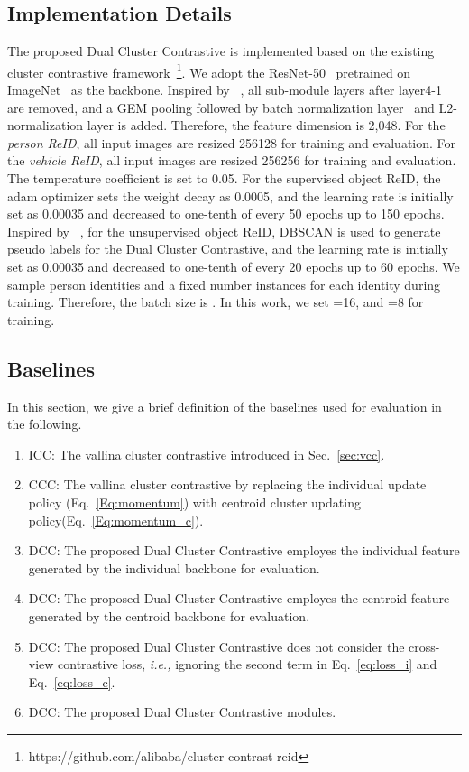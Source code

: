 \documentclass[10pt,twocolumn,letterpaper]{article}
\begin{document}
\subsection{Implementation Details}
The proposed Dual Cluster Contrastive is implemented based on the existing cluster contrastive framework~\cite{dai2021cluster}\footnote{https://github.com/alibaba/cluster-contrast-reid}.
We adopt the ResNet-50~\cite{he2016deep} pretrained on ImageNet~\cite{deng2009imagenet} as the backbone.
Inspired by ~\cite{DBLP:conf/cvpr/0004GLL019}, all sub-module layers after layer4-1 are removed, and a GEM pooling followed by batch normalization layer~\cite{DBLP:conf/icml/IoffeS15} and L2-normalization layer is added. 
Therefore, the feature dimension  is 2,048.
For the \emph{person ReID}, all input images are resized 256128 for training and evaluation.
For the \emph{vehicle ReID}, all input images are resized 256256 for training and evaluation.
The temperature coefficient  is set to 0.05.
For the supervised object ReID, the adam optimizer sets the weight decay as 0.0005, and the learning rate is initially set as 0.00035 and decreased to one-tenth of every 50 epochs up to 150 epochs. 
Inspired by ~\cite{dai2021cluster}, for the unsupervised object ReID,  DBSCAN is used to generate pseudo labels for the Dual Cluster Contrastive, and the learning rate is initially set as 0.00035 and decreased to one-tenth of every 20 epochs up to 60 epochs.
We sample  person identities and a fixed number  instances for each identity during training. 
Therefore, the batch size is .
In this work, we set =16, and =8 for training.
\subsection{Baselines}
In this section, we give a brief definition of the baselines used for evaluation in the following.
\begin{enumerate}
\item ICC: The vallina cluster contrastive  introduced in Sec.~\ref{sec:vcc}.
\item CCC: The vallina cluster contrastive  by replacing the individual update policy (Eq.~\eqref{Eq:momentum}) with centroid cluster updating policy(Eq.~\eqref{Eq:momentum_c}). 
\item DCC: The proposed Dual Cluster Contrastive employes the individual feature  generated by the individual backbone for evaluation.
\item DCC: The proposed Dual Cluster Contrastive employes the centroid feature  generated by the centroid backbone for evaluation.
\item DCC: The proposed Dual Cluster Contrastive does not consider the cross-view contrastive loss, \emph{i.e.,} ignoring the second term in Eq.~\eqref{eq:loss_i} and Eq.~\eqref{eq:loss_c}.
\item DCC: The proposed Dual Cluster Contrastive modules.
\end{enumerate}
\end{document}
